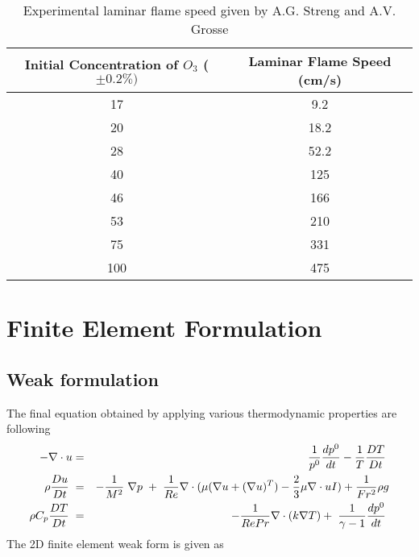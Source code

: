 \documentclass[10pt]{ubthesis}
\begin{document}
\begin{table}[h]
\caption {Experimental laminar flame speed given by A.G. Streng and A.V. Grosse} \label{tab:title}
\begin{center}

\begin{tabular}{|c|c|}
\hline
 \textbf{ Initial Concentration of $O_3$ ($\pm 0.2 \% )$}  &  \textbf{ Laminar Flame Speed (cm/s)} \\ \hline
 17& 9.2 \\  \hline
 20& 18.2 \\ \hline
 28& 52.2 \\ \hline
 40& 125 \\  \hline
 46&  166 \\ \hline
 53&  210 \\ \hline
 75&  331 \\ \hline
100&  475 \\ \hline
\end{tabular}
\end{center}
\end{table}
\chapter{Finite Element Formulation}
\section{Weak formulation}
The final equation obtained by applying various thermodynamic properties are following
\begin{eqnarray}
-\nabla \cdot u &=& \frac{1}{p^0} \frac{d p^0}{d t} - \frac{1}{T}\frac{D T}{D t} \hspace{1mm}\\
\rho \frac{D u}{D t} \hspace{1mm} &=& -\frac{1}{M^2}\hspace{1mm}\nabla p\hspace{1mm}+\hspace{1mm}\frac{1}{Re}\nabla \cdot (\mu (\nabla u +(\nabla u)^T) - \frac{2}{3}\mu \nabla \cdot u I) + \frac{1}{Fr^2}\rho g \\
\rho C_p \frac{D T}{D t} \hspace{1mm}&=&\hspace{1mm} -  \frac{1}{Re Pr}\nabla\cdot (k \nabla T) + \hspace{1mm} \frac{1}{\gamma -1} \frac{d p^0}{d t}\hspace{1mm}\\
\end{eqnarray}
The 2D finite element weak form  is given as
\end{document}
